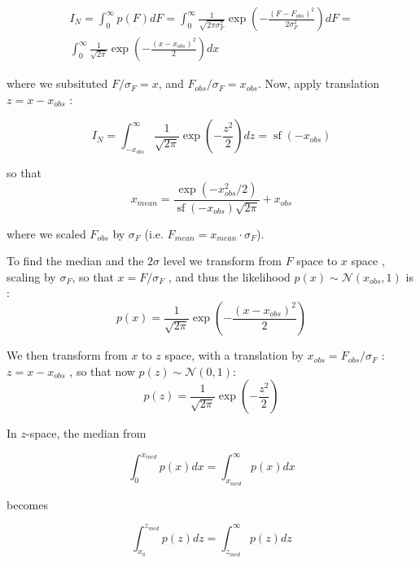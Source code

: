 \documentclass[fleqn,usenatbib]{mnras}  %
\DeclareMathOperator\sf{sf}
\begin{document}
\begin{multline}
I_{N} = \int _{0} ^ {\infty}{ p(F) dF} = \int _{0} ^ {\infty} {\frac{1}{\sqrt{2\pi\sigma_{F}^{2}}}     \exp{\left(-\frac{(F-F_{obs})^{2}}{2\sigma_{F}^{2}}\right)} } dF=  \\  
\int _{0} ^ {\infty} {\frac{1}{\sqrt{2\pi}}     \exp{\left(-\frac{(x-x_{obs})^{2}}{2}\right)} } dx
\end{multline}

where we subsituted $F / \sigma_{F} = x$, and $F_{obs} / \sigma_{F} = x_{obs}$. Now, apply translation  $z = x - x_{obs} $  : 

\begin{equation}
I_{N} = \int _{-x_{obs}} ^ {\infty} {\frac{1}{\sqrt{2\pi}}     \exp{\left(-\frac{z^{2}}{2}\right)} } dz =   \sf{(-x_{obs})}
\end{equation}

so that 
\begin{equation}
x_{mean} = \frac{\exp{(- x_{obs}^{2} / 2 )} }{\sf{(-x_{obs})}\sqrt{2 \pi}} + x_{obs} 
\end{equation}

where we scaled $F_{obs}$ by  $\sigma_F$  (i.e. $F_{mean} = x_{mean} \cdot \sigma_{F}$). 



\bigskip

To find the median and the $2\sigma$ level we transform from $F$ space to $x$ space , scaling by  $\sigma_{F}$, so that $x = F / \sigma_{F}$ , and thus the likelihood $p(x) \sim \mathcal{N}(x_{obs},1)$ is :
\begin{equation}
p(x) = \frac{1}{\sqrt{2  \pi }} \exp{ \left(-\frac{(x-x_{obs})^{2}}{2}\right)}
\end{equation}

We  then transform from $x$ to $z$ space, with  a translation by $x_{obs} = F_{obs} / \sigma_{F}$ :  $z = x - x_{obs}$  , so that now  $p(z) \sim \mathcal{N}(0,1)$:
\begin{equation}
p(z) = \frac{1}{\sqrt{2  \pi }} \exp{ \left(-\frac{z^2}{2}\right)}
\end{equation}



In $z$-space, the median from 

\begin{equation}
\int_{0}^{x_{med}} {p(x)dx} = \int_{x_{med}}^{\infty} {p(x)dx}
\end{equation}
 
becomes 

\begin{equation}
\label{eq:median}
\int_{x_{0}}^{z_{med}}{p(z)dz} = \int_{z_{med}}^{\infty}{p(z)dz}
\end{equation}
\end{document}
